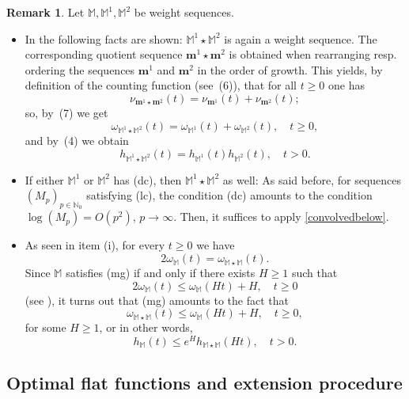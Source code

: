 \documentclass[11pt,a4paper]{article}
\theoremstyle{plain}
\theoremstyle{definition}
\newtheorem{rema}[theo]{Remark}
\newcommand{\N}{\mathbb{N}}
\newcommand{\M}{\mathbb{M}}
\def\bm{\boldsymbol{m}}
\begin{document}
\begin{rema}\label{convolvesequrem0}
Let $\M,\mathbb{M}^1,\mathbb{M}^2$ be weight sequences.
\begin{itemize}
\item[(i)] In \cite[Lemma 3.5]{komatsu} the following facts are shown: $\mathbb{M}^1\star\mathbb{M}^2$ is again a weight sequence. The corresponding quotient sequence $\bm^1\star\bm^2$ is obtained when rearranging resp. ordering the sequences $\bm^1$ and $\bm^2$ in the order of growth. This yields, by definition of the counting function (see~(6)), that for all $t\ge 0$ one has
$$\nu_{\bm^1\star\bm^2}(t)= \nu_{\bm^1}(t)+\nu_{\bm^2}(t);$$
so, by~(7) we get
$$\omega_{\mathbb{M}^1\star\mathbb{M}^2}(t)= \omega_{\mathbb{M}^1}(t)+\omega_{\mathbb{M}^2}(t),\quad t\ge 0,$$
and by~(4) we obtain
\begin{equation}\label{functionhforconvolved}
h_{\mathbb{M}^1\star\mathbb{M}^2}(t)= h_{\mathbb{M}^1}(t)h_{\mathbb{M}^2}(t),\quad t>0.
\end{equation}
\item[(ii)] If either $\mathbb{M}^1$ or $\mathbb{M}^2$ has (dc), then $\mathbb{M}^1\star\mathbb{M}^2$ as well: As said before, for sequences $(M_p)_{p\in\N_0}$ satisfying (lc), the condition  (dc) amounts to the condition $\log(M_p)=O(p^2)$, $p\to\infty$. Then, it suffices to apply \eqref{convolvedbelow}.
\item[(iii)] As seen in item (i), for every $t\ge 0$ we have
\begin{equation*}
2\omega_{\mathbb{M}}(t)=\omega_{\mathbb{M}\star\mathbb{M}}(t).
\end{equation*}
Since $\mathbb{M}$ satisfies (mg) if and only if there exists $H\ge 1$ such that
\begin{equation*}
2\omega_{\mathbb{M}}(t)\le\omega_{\mathbb{M}}(Ht)+H,\quad t\ge 0
\end{equation*}
(see \cite[Prop.~3.6]{komatsu}), it turns out that (mg) amounts to the fact that
$$
\omega_{\mathbb{M}\star\mathbb{M}}(t)\le \omega_{\mathbb{M}}(Ht)+H,\quad t\ge 0,
$$
for some $H\ge 1$, or in other words,
\begin{equation*}
h_{\mathbb{M}}(t)\le e^Hh_{\mathbb{M}\star\mathbb{M}}(Ht),\quad t>0.
\end{equation*}
\end{itemize}
\end{rema}

\subsection{Optimal flat functions and extension procedure}\label{subsectOptFlatConvolved}
\end{document}
